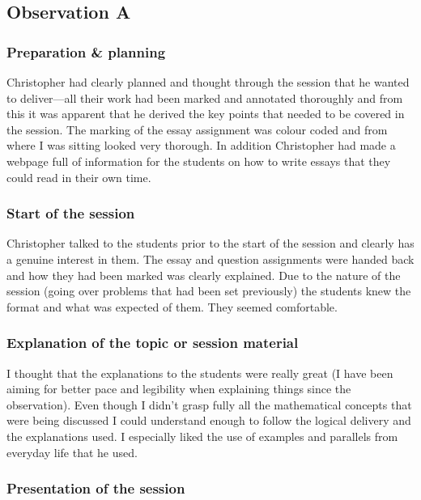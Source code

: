 \subsection{Observation A}\label{sec:me-A}

\subsubsection{Preparation \& planning}\label{sec:A-preparation}

Christopher had clearly planned and thought through the session that he wanted to deliver---all their work had been marked and annotated thoroughly and from this it was apparent that he derived the key points that needed to be covered in the session. The marking of the essay assignment was colour coded and from where I was sitting looked very thorough. In addition Christopher had made a webpage full of information for the students on how to write essays that they could read in their own time.

\subsubsection{Start of the session}\label{sec:A-start}

Christopher talked to the students prior to the start of the session and clearly has a genuine interest in them. The essay and question assignments were handed back and how they had been marked was clearly explained. Due to the nature of the session (going over problems that had been set previously) the students knew the format and what was expected of them. They seemed comfortable.

\subsubsection{Explanation of the topic or session material}\label{sec:A-topic}

I thought that the explanations to the students were really great (I have been aiming for better pace and legibility when explaining things since the observation). Even though I didn't grasp fully all the mathematical concepts that were being discussed I could understand enough to follow the logical delivery and the explanations used. I especially liked the use of examples and parallels from everyday life that he used.

\subsubsection{Presentation of the session}\label{sec:A-presentation}

